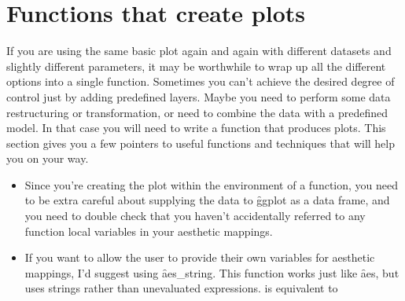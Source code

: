 {\section{Functions that create plots}
\label{sec:functions}

If you are using the same basic plot again and again with different datasets and slightly different parameters, it may be worthwhile to wrap up all the different options into a single function. Sometimes you can't achieve the desired degree of control just by adding predefined layers. Maybe you need to perform some data restructuring or transformation, or need to combine the data with a predefined model. In that case you will need to write a function that produces \ggplot plots. This section gives you a few pointers to useful functions and techniques that will help you on your way.

% 
% 
% 
% 

\begin{itemize}
  \item Since you're creating the plot within the environment of a function, you need to be extra careful about supplying the data to \f{ggplot} as a data frame, and you need to double check that you haven't accidentally referred to any function local variables in your aesthetic mappings.
  
  \item If you want to allow the user to provide their own variables for aesthetic mappings, I'd suggest using \f{aes_string}.  This function works just like \f{aes}, but uses strings rather than unevaluated expressions.  is equivalent to 
\end{itemize}}
